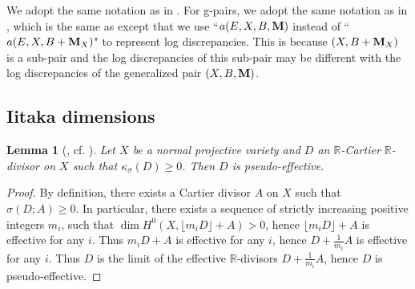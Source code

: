 \documentclass[11pt]{amsart}
\numberwithin{equation}{section}
\newcommand{\Mm}{{\bf{M}}}
\newcommand{\Rr}{\mathbb{R}}
\newtheorem{lem}[thm]{Lemma}
\theoremstyle{definition}
\theoremstyle{definition}
\theoremstyle{definition}
\begin{document}
We adopt the same notation as in \cite{KM98,BCHM10}. For g-pairs, we adopt the same notation as in \cite{HL21}, which is the same as \cite{Has20b,Has22} except that we use ``$a(E,X,B,\Mm)$ instead of ``$a(E,X,B+\Mm_X)$" to represent log discrepancies. This is because $(X,B+\Mm_X)$ is a sub-pair and the log discrepancies of this sub-pair may be different with the log discrepancies of the generalized pair $(X,B,\Mm)$.



\subsection{Iitaka dimensions}

\begin{lem}[{\cite[Version 2, Lemma 2.9]{HL21}, cf. \cite[V. 2.6(5) Remark]{Nak04}}]\label{lem: num dimension >=0 imply pe}
Let $X$ be a normal projective variety and $D$ an $\Rr$-Cartier $\Rr$-divisor on $X$ such that $\kappa_{\sigma}(D)\geq 0$. Then $D$ is pseudo-effective.
\end{lem}
\begin{proof}
By definition, there exists a Cartier divisor $A$ on $X$ such that $\sigma(D;A)\geq 0$. In particular, there exists a sequence of strictly increasing positive integers $m_i$, such that $\dim H^0(X,\lfloor m_iD\rfloor+A)>0$, hence $\lfloor m_iD\rfloor+A$ is effective for any $i$. Thus $m_iD+A$ is effective for any $i$, hence $D+\frac{1}{m_i}A$ is effective for any $i$. Thus $D$ is the limit of the effective $\Rr$-divisors $D+\frac{1}{m_i}A$, hence $D$ is pseudo-effective.
\end{proof}
\end{document}
